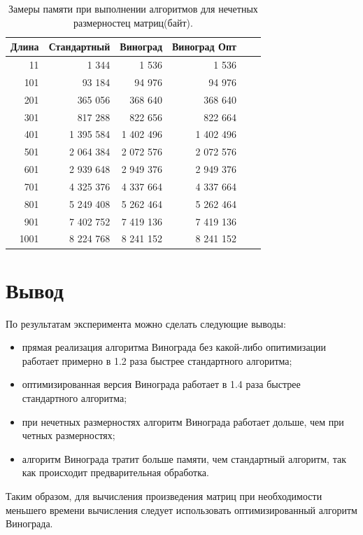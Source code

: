 \begin{table}[!ht]
    \centering
    \caption{\label{tab:tabl}Замеры памяти при выполнении алгоритмов для нечетных размерностец матриц(байт).}
    \begin{tabular}{|r|r|r|r|r|r|}
    \hline
    Длина & Стандартный & Виноград & Виноград Опт   \\ \hline
        11 & 1 344 & 1 536 & 1 536   \\ \hline
        101 & 93 184 & 94 976 & 94 976   \\ \hline
        201 & 365 056 & 368 640 & 368 640   \\ \hline
        301 & 817 288 & 822 656 & 822 664   \\ \hline
        401 & 1 395 584 & 1 402 496 & 1 402 496   \\ \hline
        501 & 2 064 384 & 2 072 576 & 2 072 576   \\ \hline
        601 & 2 939 648 & 2 949 376 & 2 949 376   \\ \hline
        701 & 4 325 376 & 4 337 664 & 4 337 664   \\ \hline
        801 & 5 249 408 & 5 262 464 & 5 262 464   \\ \hline
        901 & 7 402 752 & 7 419 136 & 7 419 136   \\ \hline
        1001 & 8 224 768 & 8 241 152 & 8 241 152  \\ \hline
    \end{tabular}
\end{table}

\clearpage
\section{Вывод}

По результатам эксперимента можно сделать следующие выводы:
\begin{itemize}[left=\parindent]
    \item прямая реализация алгоритма Винограда без какой-либо опитимизации
        работает примерно в 1.2 раза быстрее стандартного алгоритма;
    \item оптимизированная версия Винограда работает в 1.4 раза быстрее
        стандартного алгоритма;
    \item при нечетных размерностях алгоритм Винограда работает дольше, чем при четных размерностях;
    \item алгоритм Винограда тратит больше памяти, чем стандартный алгоритм, так как
        происходит предварительная обработка.
\end{itemize}

Таким образом, для вычисления произведения матриц при необходимости меньшего времени вычисления
следует использовать оптимизированный алгоритм Винограда.
